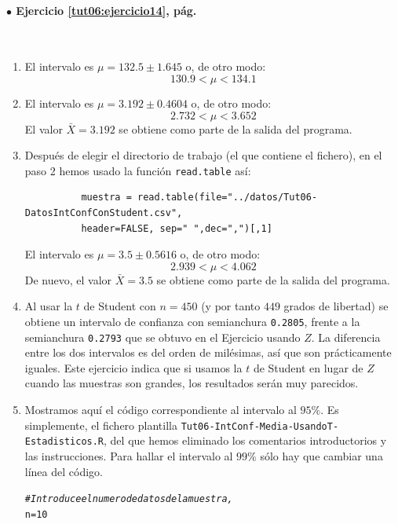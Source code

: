 \documentclass[10pt,a4paper]{article}\usepackage[]{graphicx}\usepackage[]{color}
\makeatletter
\newcommand{\hlnum}[1]{\textcolor[rgb]{0.686,0.059,0.569}{#1}}%
\newcommand{\hlcom}[1]{\textcolor[rgb]{0.678,0.584,0.686}{\textit{#1}}}%
\newcommand{\hlstd}[1]{\textcolor[rgb]{0.345,0.345,0.345}{#1}}%
\newcommand{\hlkwb}[1]{\textcolor[rgb]{0.69,0.353,0.396}{#1}}%
\newenvironment{kframe}{%
 \def\at@end@of@kframe{}%
 \ifinner\ifhmode%
  \def\at@end@of@kframe{\end{minipage}}%
  \begin{minipage}{\columnwidth}%
 \fi\fi%
 \def\FrameCommand##1{\hskip\@totalleftmargin \hskip-\fboxsep
 \colorbox{shadecolor}{##1}\hskip-\fboxsep
     \hskip-\linewidth \hskip-\@totalleftmargin \hskip\columnwidth}%
 \MakeFramed {\advance\hsize-\width
   \@totalleftmargin\z@ \linewidth\hsize
   \@setminipage}}%
 {\par\unskip\endMakeFramed%
 \at@end@of@kframe}
\newenvironment{knitrout}{}{} %
\newcounter {cont01}
\makeatother
\begin{document}
\paragraph{\bf $\bullet$ Ejercicio \ref{tut06:ejercicio14}, pág. \pageref{tut06:ejercicio14}}
\label{tut06:ejercicio14:sol}\quad\\

\begin{enumerate}
  \item El intervalo es $\mu =  132.5\pm 1.645$ o, de otro modo:
    \[ 130.9 < \mu < 134.1\]

  \item El intervalo es $\mu = 3.192 \pm 0.4604$ o, de otro modo:
  \[ 2.732  < \mu < 3.652\]
  El valor $\bar X = 3.192$ se obtiene como parte de la salida del programa.

  \item Después de elegir el directorio de trabajo (el que contiene el fichero), en el paso 2 hemos usado la función {\tt read.table} así:
        \begin{verbatim}
          muestra = read.table(file="../datos/Tut06-DatosIntConfConStudent.csv",
          header=FALSE, sep=" ",dec=",")[,1]
        \end{verbatim}

  El intervalo es $\mu = 3.5 \pm 0.5616$ o, de otro modo:
  \[ 2.939  < \mu < 4.062\]
  De nuevo, el valor $\bar X = 3.5$ se obtiene como parte de la salida del programa.

  \item Al usar la $t$ de Student con $n=450$ (y por tanto $449$ grados de libertad) se obtiene un intervalo de confianza con semianchura {\tt 0.2805}, frente a la semianchura {\tt 0.2793} que se obtuvo en el Ejercicio usando $Z$. La diferencia entre los dos intervalos es del orden de milésimas, así que son prácticamente iguales. Este ejercicio indica que si usamos la $t$ de Student en lugar de $Z$ cuando las muestras son grandes, los resultados serán muy parecidos.

\item Mostramos aquí el código correspondiente al intervalo al $95\%$. Es simplemente, el fichero plantilla {\tt Tut06-IntConf-Media-UsandoT-Estadisticos.R}, del que hemos eliminado los comentarios introductorios y las instrucciones. Para hallar el intervalo al $99\%$ sólo hay que cambiar  una línea del código.
\begin{knitrout}
\color{fgcolor}\begin{kframe}
\begin{alltt}
\hlcom{# Introduce el numero de datos de la muestra,}
\hlstd{n} \hlkwb{=} \hlnum{10}


\end{alltt}
\end{kframe}
\end{knitrout}
\end{enumerate}
\end{document}
